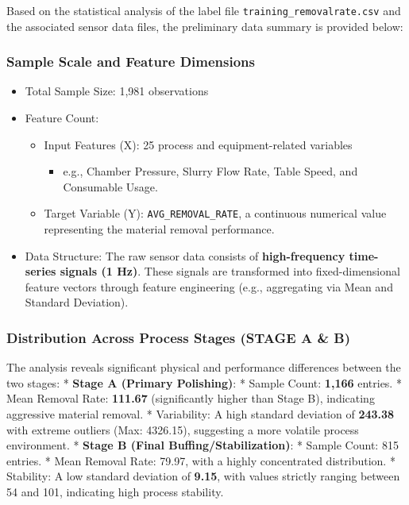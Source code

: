 \documentclass[11pt]{article}
\providecommand{\tightlist}{%
      \setlength{\itemsep}{0pt}\setlength{\parskip}{0pt}}
\begin{document}
    Based on the statistical analysis of the label file
\texttt{training\_removalrate.csv} and the associated sensor data files,
the preliminary data summary is provided below:

\subsubsection{Sample Scale and Feature
Dimensions}\label{sample-scale-and-feature-dimensions}

\begin{itemize}
\tightlist
\item
  Total Sample Size: 1,981 observations
\item
  Feature Count:

  \begin{itemize}
  \tightlist
  \item
    Input Features (X): 25 process and equipment-related variables

    \begin{itemize}
    \tightlist
    \item
      e.g., Chamber Pressure, Slurry Flow Rate, Table Speed, and
      Consumable Usage.
    \end{itemize}
  \item
    Target Variable (Y): \texttt{AVG\_REMOVAL\_RATE}, a continuous
    numerical value representing the material removal performance.
  \end{itemize}
\item
  Data Structure: The raw sensor data consists of \textbf{high-frequency
  time-series signals (1 Hz)}. These signals are transformed into
  fixed-dimensional feature vectors through feature engineering (e.g.,
  aggregating via Mean and Standard Deviation).
\end{itemize}

\subsubsection{Distribution Across Process Stages (STAGE A \&
B)}\label{distribution-across-process-stages-stage-a-b}

The analysis reveals significant physical and performance differences
between the two stages: * \textbf{Stage A (Primary Polishing)}: * Sample
Count: \textbf{1,166} entries. * Mean Removal Rate: \textbf{111.67}
(significantly higher than Stage B), indicating aggressive material
removal. * Variability: A high standard deviation of \textbf{243.38}
with extreme outliers (Max: 4326.15), suggesting a more volatile process
environment. * \textbf{Stage B (Final Buffing/Stabilization)}: * Sample
Count: 815 entries. * Mean Removal Rate: 79.97, with a highly
concentrated distribution. * Stability: A low standard deviation of
\textbf{9.15}, with values strictly ranging between 54 and 101,
indicating high process stability.
\end{document}
